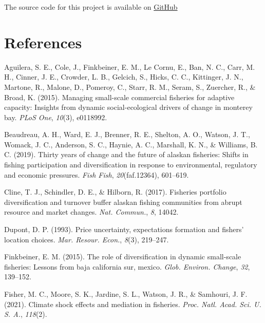 \documentclass[
  11pt,
]{article}
\newlength{\cslhangindent}
\newenvironment{CSLReferences}[2] %
 {\begin{list}{}{%
  \setlength{\itemindent}{0pt}
  \setlength{\leftmargin}{0pt}
  \setlength{\parsep}{0pt}
  \ifodd #1
   \setlength{\leftmargin}{\cslhangindent}
   \setlength{\itemindent}{-1\cslhangindent}
  \fi
  \setlength{\itemsep}{#2\baselineskip}}}
 {\end{list}}
\begin{document}
The source code for this project is available on
\href{https://github.com/fquezadae/Impact-of-Environmental-Variability-on-Harvest}{GitHub}

\section*{References}\label{references}

\label{refs}
\begin{CSLReferences}{1}{0}
Aguilera, S. E., Cole, J., Finkbeiner, E. M., Le Cornu, E., Ban, N. C.,
Carr, M. H., Cinner, J. E., Crowder, L. B., Gelcich, S., Hicks, C. C.,
Kittinger, J. N., Martone, R., Malone, D., Pomeroy, C., Starr, R. M.,
Seram, S., Zuercher, R., \& Broad, K. (2015). Managing small-scale
commercial fisheries for adaptive capacity: Insights from dynamic
social-ecological drivers of change in monterey bay. \emph{PLoS One},
\emph{10}(3), e0118992.

Beaudreau, A. H., Ward, E. J., Brenner, R. E., Shelton, A. O., Watson,
J. T., Womack, J. C., Anderson, S. C., Haynie, A. C., Marshall, K. N.,
\& Williams, B. C. (2019). Thirty years of change and the future of
alaskan fisheries: Shifts in fishing participation and diversification
in response to environmental, regulatory and economic pressures.
\emph{Fish Fish}, \emph{20}(faf.12364), 601--619.

Cline, T. J., Schindler, D. E., \& Hilborn, R. (2017). Fisheries
portfolio diversification and turnover buffer alaskan fishing
communities from abrupt resource and market changes. \emph{Nat.
Commun.}, \emph{8}, 14042.

Dupont, D. P. (1993). Price uncertainty, expectations formation and
fishers' location choices. \emph{Mar. Resour. Econ.}, \emph{8}(3),
219--247.

Finkbeiner, E. M. (2015). The role of diversification in dynamic
small-scale fisheries: Lessons from baja california sur, mexico.
\emph{Glob. Environ. Change}, \emph{32}, 139--152.

Fisher, M. C., Moore, S. K., Jardine, S. L., Watson, J. R., \& Samhouri,
J. F. (2021). Climate shock effects and mediation in fisheries.
\emph{Proc. Natl. Acad. Sci. U. S. A.}, \emph{118}(2).


\end{CSLReferences}
\end{document}
